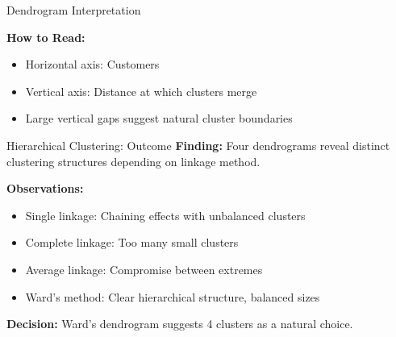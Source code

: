 \documentclass[aspectratio=169,ignorenonframetext]{beamer}
\begin{document}
\begin{frame}[fragile]{Dendrogram Interpretation}
\begin{Shaded}
\begin{Highlighting}[]
\OperatorTok{=}\NormalTok{(}\NormalTok{, }\NormalTok{))}
\NormalTok{dendrogram(linkage\_matrices[}\NormalTok{],}
\OperatorTok{=}\NormalTok{,}
\OperatorTok{=}\NormalTok{)}
\OperatorTok{=}\OperatorTok{=}\OperatorTok{=}\StringTok{\textquotesingle{}{-}{-}\textquotesingle{}}\NormalTok{,}
\OperatorTok{=}\NormalTok{)}
\end{Highlighting}
\end{Shaded}

\textbf{How to Read:}

\begin{itemize}
\item
  Horizontal axis: Customers
\item
  Vertical axis: Distance at which clusters merge
\item
  Large vertical gaps suggest natural cluster boundaries
\end{itemize}
\end{frame}

\begin{frame}{Hierarchical Clustering: Outcome}
\textbf{Finding:} Four dendrograms reveal distinct clustering structures
depending on linkage method.

\textbf{Observations:}

\begin{itemize}
\item
  Single linkage: Chaining effects with unbalanced clusters
\item
  Complete linkage: Too many small clusters
\item
  Average linkage: Compromise between extremes
\item
  Ward's method: Clear hierarchical structure, balanced sizes
\end{itemize}

\textbf{Decision:} Ward's dendrogram suggests 4 clusters as a natural
choice.
\end{frame}
\end{document}
